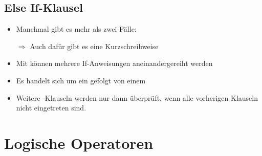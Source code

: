 \subsection{Else If-Klausel}

\begin{frame}
    \slidehead
    \begin{itemize}
        \item Manchmal gibt es mehr als zwei Fälle:
        \item[$\Rightarrow$] Auch dafür gibt es eine Kurzschreibweise
    \end{itemize}
\end{frame}

\begin{frame}
    \slidehead

    \begin{itemize}
        \item Mit  können mehrere If-Anweisungen aneinandergereiht werden
        \item Es handelt sich um ein  gefolgt von einem 
        \item Weitere -Klauseln werden nur dann überprüft, wenn alle vorherigen Klauseln nicht eingetreten sind.
    \end{itemize}
\end{frame}

\livecoding


\section{Logische Operatoren}


